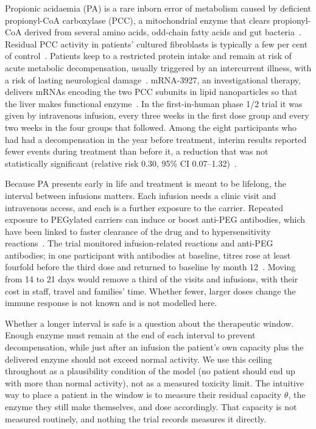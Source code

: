 \documentclass[11pt]{article}
\begin{document}
Propionic acidaemia (PA) is a rare inborn error of metabolism caused by deficient
propionyl-CoA carboxylase (PCC), a mitochondrial enzyme that clears propionyl-CoA derived from
several amino acids, odd-chain fatty acids and gut bacteria~\cite{pa_guidelines,propionate_sources}.
Residual PCC activity in patients' cultured fibroblasts is typically a few per cent of
control~\cite{pcc_residual_activity}. Patients keep to a restricted protein intake and remain at
risk of acute metabolic decompensation, usually triggered by an intercurrent illness, with a risk
of lasting neurological damage~\cite{pa_guidelines,pathophys_complications}.
mRNA-3927, an investigational therapy, delivers mRNAs encoding the two PCC subunits in lipid
nanoparticles so that the liver makes functional enzyme~\cite{jiang2020dual,mrna_moa}. In the
first-in-human phase 1/2 trial it was given by intravenous infusion, every three weeks in the
first dose group and every two weeks in the four groups that followed. Among the eight
participants who had had a decompensation in the year before treatment, interim results reported
fewer events during treatment than before it, a reduction that was not statistically significant
(relative risk 0.30, 95\% CI 0.07--1.32)~\cite{trial_phase12}.

Because PA presents early in life and treatment is meant to be lifelong, the interval between
infusions matters. Each infusion needs a clinic visit and intravenous access, and each is a
further exposure to the carrier. Repeated exposure to PEGylated carriers can induce or boost
anti-PEG antibodies, which have been linked to faster clearance of the drug and to
hypersensitivity reactions~\cite{kozma2020antipeg,ju2022antipeg}. The trial monitored
infusion-related reactions and anti-PEG antibodies; in one participant with antibodies at
baseline, titres rose at least fourfold before the third dose and returned to baseline by month
12~\cite{trial_phase12}. Moving from 14 to 21 days would remove a third of the visits and
infusions, with their cost in staff, travel and families' time. Whether fewer, larger doses change
the immune response is not known and is not modelled here.

Whether a longer interval is safe is a question about the therapeutic window. Enough enzyme must
remain at the end of each interval to prevent decompensation, while just after an infusion the
patient's own capacity plus the delivered enzyme should not exceed normal activity. We use this
ceiling throughout as a plausibility condition of the model (no patient should end up with more
than normal activity), not as a measured toxicity limit. The intuitive way to place a patient in
the window is to measure their residual capacity $\theta$, the enzyme they still make themselves,
and dose accordingly. That capacity is not measured routinely, and nothing the trial records measures it directly.
\end{document}
